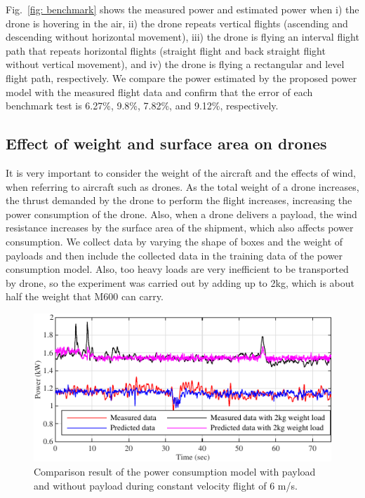 \documentclass[journal]{./template/IEEEtran}
\begin{document}
Fig.~\ref{fig: benchmark} shows the measured power and estimated power when i) the drone is hovering in the air, ii) the drone repeats vertical flights (ascending and descending without horizontal movement), iii) the drone is flying an interval flight path that repeats horizontal flights (straight flight and back straight flight without vertical movement), and iv) the drone is flying a rectangular and level flight path, respectively. 
We compare the power estimated by the proposed power model with the measured flight data and confirm that the error of each benchmark test is 6.27\%, 9.8\%, 7.82\%, and 9.12\%, respectively.





\subsection{Effect of weight and surface area on drones}
It is very important to consider the weight of the aircraft and the effects of wind, when referring to aircraft such as drones.
As the total weight of a drone increases, the thrust demanded by the drone to perform the flight increases, increasing the power consumption of the drone. 
Also, when a drone delivers a payload, the wind resistance increases by the surface area of the shipment, which also affects power consumption.
We collect data by varying the shape of boxes and the weight of payloads and then include the collected data in the training data of the power consumption model.
Also, too heavy loads are very inefficient to be transported by drone, so the experiment was carried out by adding up to 2kg, which is about half the weight that M600 can carry.

\begin{figure}[ht]
\centering\includegraphics[scale=1.0]{fig9/compare_weight8x4.pdf}
\caption{Comparison result of the power consumption model with payload and without payload during constant velocity flight of 6 m/s.}
\label{fig: Model_weight}
\end{figure}
\end{document}
